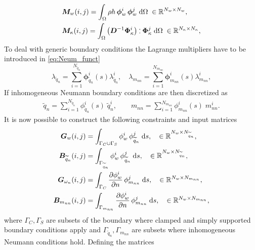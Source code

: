 \documentclass[letterpaper, 10 pt, conference]{ieeeconf}
\def\onedot{$\mathsurround0pt\ldotp$}
\def\cddot{%
	\mathbin{\vcenter{\baselineskip.67ex
			\hbox{\onedot}\hbox{\onedot}}%
}}
\begin{document}
\begin{equation}
\begin{aligned}
&\bm{M}_w(i,j) = \int_{\Omega} \rho h \, \bm{\phi}_w^i \, \bm{\phi}_w^j \d\Omega \; \in \mathbb{R}^{N_w \times N_w}, \\
&\bm{M}_\kappa(i,j) = \int_{\Omega}  \left( \bm{D}^{-1} \bm{\Phi}_\kappa^i \right) \cddot \bm{\Phi}_\kappa^j \d\Omega \; \in \mathbb{R}^{N_\kappa \times N_\kappa},\\
\end{aligned}
\end{equation}
To deal with generic boundary conditions the Lagrange multipliers have to be introduced in \eqref{eq:Neum_funct}
\begin{equation}
\lambda_{\widetilde{q}_n} = \sum_{i = 1}^{N_{\widetilde{q}_n}} \bm{\phi}^i_{\widetilde{q}_n}(s) {\lambda}^i_{\widetilde{q}_n}, \quad
\lambda_{m_{nn}} = \sum_{i = 1}^{N_{m_{nn}}} \bm{\phi}^i_{m_{nn}}(s) {\lambda}^i_{m_{nn}},
\end{equation}
If inhomogeneous Neumann boundary conditions are then discretized as
\begin{equation}
\begin{aligned}
\widetilde{q}_n = \sum_{i = 1}^{N_{\widetilde{q}_n}} \phi_{\widetilde{q}_n}^i(s) \; \widetilde{q}_n^i, \qquad
m_{nn} = \sum_{i = 1}^{N_{m_{nn}}} \phi_{m_{nn}}^i(s) \; m_{nn}^i.
\end{aligned}
\end{equation}
It is now possible to construct the following constraints and input matrices
\begin{equation}
\begin{aligned}
\bm{G}_{w}(i,j) &= \int_{\Gamma_{C} \cup \Gamma_{S} } {\phi}_{w}^i \, {\phi}_{\widetilde{q}_n}^j \d{s}, \quad  \in \mathbb{R}^{N_w \times N_{\widetilde{q}_n}},\\
\bm{B}_{\widetilde{q}_n}(i,j) &= \int_{\Gamma_{\widetilde{q}_n}} {\phi}_{w}^i \, {\phi}_{\widetilde{q}_n}^j \d{s}, \quad  \in \mathbb{R}^{N_w \times N_{\widetilde{q}_n}}, \\
\bm{G}_{\omega_n}(i,j) &= \int_{\Gamma_{C}} \diffp{\phi_w^i}{n} \, \phi_{m_{nn}}^j \d{s}, \quad \in \mathbb{R}^{N_w \times N_{m_{nn}}}, \\
\bm{B}_{m_{nn}}(i,j) &= \int_{\Gamma_{m_{nn}}} \diffp{\phi_w^i}{n} \, \phi_{m_{nn}}^j \d{s}, \quad \in \mathbb{R}^{N_w \times N_{m_{nn}}},\\
\end{aligned} 
\end{equation}
where $\Gamma_{C},\Gamma_{S}$ are subsets of the boundary where clamped and simply supported boundary conditions apply and $\Gamma_{\widetilde{q}_n},\Gamma_{m_{nn}}$ are subsets where inhomogeneous Neumann conditions hold. Defining the matrices 
\end{document}
